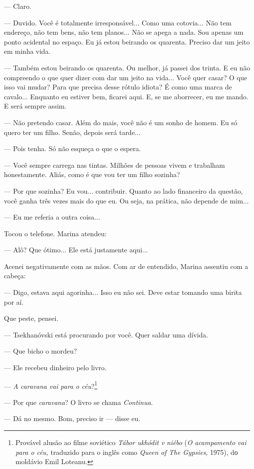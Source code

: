 --- Claro.

--- Duvido. Você é totalmente irresponsável... Como uma cotovia... Não
tem endereço, não tem bens, não tem planos... Não se apega a nada. Sou
apenas um ponto acidental no espaço. Eu já estou beirando os quarenta.
Preciso dar um jeito em minha vida.

--- Também estou beirando os quarenta. Ou melhor, já passei dos trinta.
E eu não compreendo o que quer dizer com dar um jeito na vida... Você
quer casar? O que isso vai mudar? Para que precisa desse rótulo idiota?
É como uma marca de cavalo... Enquanto eu estiver bem, ficarei aqui. E,
se me aborrecer, eu me mando. E será sempre assim.

--- Não pretendo casar. Além do mais, você não é um sonho de homem. Eu
só quero ter um filho. Senão, depois será tarde...

--- Pois tenha. Só não esqueça o que o espera.

--- Você sempre carrega nas tintas. Milhões de pessoas vivem e trabalham
honestamente. Aliás, como é que vou ter um filho sozinha?

--- Por que sozinha? Eu vou... contribuir. Quanto ao lado financeiro da
questão, você ganha três vezes mais do que eu. Ou seja, na prática, não
depende de mim...

--- Eu me referia a outra coisa...

Tocou o telefone. Marina atendeu:

--- Alô? Que ótimo... Ele está justamente aqui...

Acenei negativamente com as mãos. Com ar de entendido, Marina assentiu
com a cabeça:

--- Digo, estava aqui agorinha... Isso eu não sei. Deve estar tomando
uma birita por aí.

Que peste, pensei.

--- Tsekhanóvski está procurando por você. Quer saldar uma dívida.

--- Que bicho o mordeu?

--- Ele recebeu dinheiro pelo livro.

--- \emph{A caravana vai para o céu}?\footnote{Provável alusão ao filme
  soviético \emph{Tábor ukhódit v niébo} (\emph{O acampamento vai para o
  céu,} traduzido para o inglês como \emph{Queen of The Gypsies,} 1975),
  dо moldávio Emil Loteanu.}

--- Por que \emph{caravana}? O livro se chama \emph{Continua}.

--- Dá no mesmo. Bom, preciso ir --- disse eu.

